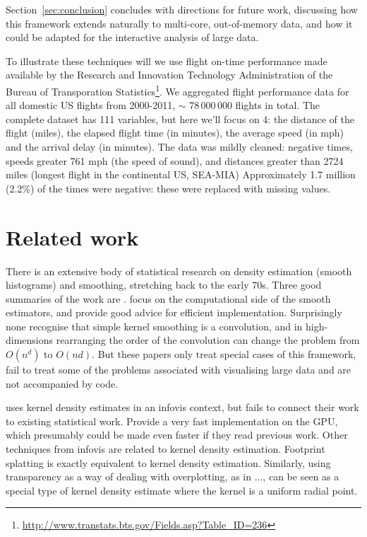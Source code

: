 \documentclass[journal]{vgtc}                %
\begin{document}
Section~\ref{sec:conclusion} concludes with directions for future work, discussing how this framework extends naturally to multi-core, out-of-memory data, and how it could be adapted for the interactive analysis of large data.

To illustrate these techniques will we use flight on-time performance made available by the Research and Innovation Technology Administration of the Bureau of Transporation Statistics\footnote{\url{http://www.transtats.bts.gov/Fields.asp?Table_ID=236}}. We aggregated flight performance data for all domestic US flights from 2000-2011, $\sim$ 78\,000\,000 flights in total. The complete dataset has 111 variables, but here we'll focus on 4: the distance of the flight (miles), the elapsed flight time (in minutes), the average speed (in mph) and the arrival delay (in minutes). The data was mildly cleaned: negative times, speeds greater 761 mph (the speed of sound), and distances greater than 2724 miles (longest flight in the continental US, SEA-MIA) Approximately 1.7 million (2.2\%) of the times were negative: these were replaced with missing values.

\section{Related work}
\label{sec:related-work}

There is an extensive body of statistical research on density estimation (smooth histograms) and smoothing, stretching back to the early 70s. Three good summaries of the work are \cite{scott:1992,bowman:1997,loader:1999a}.    \cite{hardle:1992,wand:1994,fan:1994} focus on the computational side of the smooth estimators, and provide good advice for efficient implementation.  Surprisingly none recognise that simple kernel smoothing is a convolution, and in high-dimensions rearranging the order of the convolution can change the problem from $O(n^d)$ to $O(nd)$. But these papers only treat special cases of this framework, fail to treat some of the problems associated with visualising large data and are not accompanied by code.

\citep{lampe:2011} uses kernel density estimates in an infovis context, but fails to connect their work to existing statistical work. Provide a very fast implementation on the GPU, which presumably could be made even faster if they read previous work. Other techniques from infovis are related to kernel density estimation. Footprint splatting \citep{becker:1997,yang:2003} is exactly equivalent to kernel density estimation. Similarly, using transparency as a way of dealing with overplotting, as in ..., can be seen as a special type of kernel density estimate where the kernel is a uniform radial point.
\end{document}
